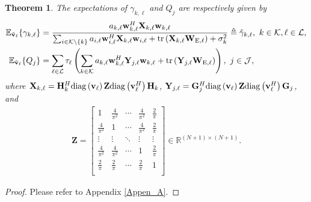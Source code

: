 \documentclass[12pt,draftclsnofoot, onecolumn]{IEEEtran}
\theoremstyle{plain}
\newtheorem{theo}{Theorem}
\begin{document}
\begin{sloppypar}
\begin{theo}\label{theo}
	\vspace{-3mm}
	The expectations of $\gamma_{k,\ell}$ and $Q_j$ are respectively given by
	{\addtolength{\jot}{5pt}
	\begin{align}
	\mathbb E_{\tilde{\mathbf v}_\ell}\{ \gamma_{k,\ell}\} & = \frac{a_{k,\ell}\mathbf w_{k,\ell}^H\mathbf X_{k,\ell}\mathbf w_{k,\ell}}{\sum_{i\in \mathcal K\backslash\{k\}}a_{i,\ell}\mathbf w_{i,\ell}^H\mathbf X_{k,\ell}\mathbf w_{i,\ell} + {\rm tr}\left(\mathbf X_{k,\ell}\mathbf W_{\mathrm E,\ell}\right)+ \sigma_k^2} \triangleq \hat \gamma_{k,\ell}, \  k\in\mathcal K, \ell\in\mathcal L, \label{expecta_SINR}\\ 
	\mathbb E_{\tilde{\mathbf v}_\ell}\{ Q_j\} & = \sum_{\ell\in\mathcal L}\tau_\ell\left(\sum_{k\in\mathcal K}a_{k,\ell}\mathbf w_{k,\ell}^H\mathbf Y_{j,\ell}\mathbf w_{k,\ell} + {\rm tr}\left(\mathbf Y_{j,\ell}\mathbf W_{\mathrm E, \ell} \right) \right), \  j\in\mathcal J, \label{expecta_E}
	\end{align}}%
	where $\mathbf X_{k,\ell} = \mathbf H_k^H{\rm diag}\left(\mathbf v_\ell\right)\mathbf Z{\rm diag}\left(\mathbf v_{\ell}^H\right)\mathbf H_k$, $\mathbf Y_{j,\ell} = \mathbf G_j^H{\rm diag}\left(\mathbf v_\ell\right)\mathbf Z{\rm diag}\left(\mathbf v_{\ell}^H\right)\mathbf G_j$, and 
	\begin{align}
	\mathbf Z = \begin{bmatrix}
	1& \frac{4}{\pi^2} & \cdots & \frac{4}{\pi^2} & \frac{2}{\pi} \\
	\frac{4}{\pi^2} & 1 & \cdots & \frac{4}{\pi^2}  & \frac{2}{\pi} \\
	\vdots & \vdots & \ddots & \vdots & \vdots \\
	\frac{4}{\pi^2} & \frac{4}{\pi^2} & \cdots &  1 & \frac{2}{\pi} \\
	\frac{2}{\pi} & \frac{2}{\pi} & \cdots & \frac{2}{\pi} & 1 \\
	\end{bmatrix} \in\mathbb R^{\left(N+1\right) \times \left(N+1\right)}.
	\end{align} 
\end{theo}
\begin{proof}
Please refer to Appendix \ref{Appen_A}.	
\end{proof}
  

\end{sloppypar}
\end{document}

